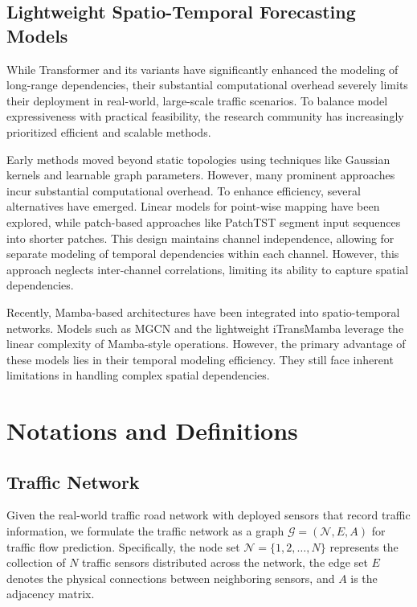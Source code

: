 \documentclass[5p,times,authoryear]{elsarticle}
\begin{document}
\subsection{Lightweight Spatio-Temporal Forecasting Models}
While Transformer and its variants have significantly enhanced the modeling of long-range dependencies, their substantial computational overhead severely limits their deployment in real-world, large-scale traffic scenarios. To balance model expressiveness with practical feasibility, the research community has increasingly prioritized efficient and scalable methods. 

Early methods moved beyond static topologies using techniques like Gaussian kernels\citep{kang2018unified} and learnable graph parameters\citep{franceschi2019learning}. However, many prominent approaches incur substantial computational overhead. To enhance efficiency, several alternatives have emerged. Linear models for point-wise mapping have been explored\citep{zeng2023transformers}, while patch-based approaches like PatchTST\citep{nie2022time} segment input sequences into shorter patches. This design maintains channel independence, allowing for separate modeling of temporal dependencies within each channel. However, this approach neglects inter-channel correlations, limiting its ability to capture spatial dependencies.

Recently, Mamba-based architectures have been integrated into spatio-temporal networks. Models such as MGCN\citep{lin2025mgcn} and the lightweight iTransMamba\citep{cao2025itransmamba} leverage the linear complexity of Mamba-style operations. However, the primary advantage of these models lies in their temporal modeling efficiency. They still face inherent limitations in handling complex spatial dependencies. 


\section{Notations and Definitions}

\subsection{Traffic Network}
Given the real-world traffic road network with deployed sensors that record traffic information, we formulate the traffic network as a graph $\mathcal{G} = (\mathcal{N}, E, A)$ for traffic flow prediction. Specifically, the node set $\mathcal{N} = \{1, 2, \ldots, N\}$ represents the collection of $N$ traffic sensors distributed across the network, the edge set $E$ denotes the physical connections between neighboring sensors, and $A$ is the adjacency matrix.
\end{document}
